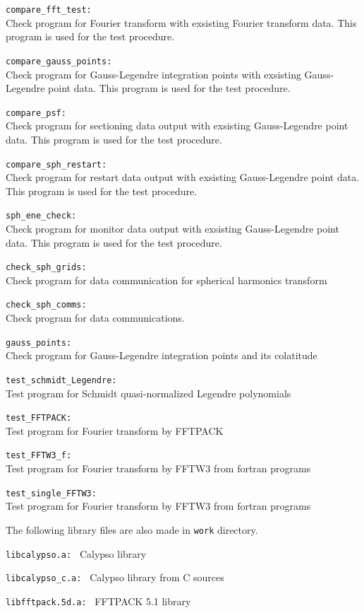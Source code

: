 \begin{description}
\item{\tt compare\_fft\_test:    }\\
	 Check program for Fourier transform with exsisting Fourier transform data. This program is used for the test procedure.
\item{\tt compare\_gauss\_points:    }\\
	 Check program for Gauss-Legendre integration points with exsisting Gauss-Legendre point data. This program is used for the test procedure.
\item{\tt compare\_psf:    }\\
	 Check program for sectioning data output with exsisting Gauss-Legendre point data. This program is used for the test procedure.
\item{\tt compare\_sph\_restart:    }\\
	 Check program for restart data output with exsisting Gauss-Legendre point data. This program is used for the test procedure.
\item{\tt sph\_ene\_check:    }\\
	 Check program for monitor data output with exsisting Gauss-Legendre point data. This program is used for the test procedure.
\item{\tt check\_sph\_grids:    }\\
	 Check program for data communication for spherical harmonics transform
\item{\tt check\_sph\_comms:   }\\
	  Check program for data communications.
\item{\tt gauss\_points:   }\\
	Check program for Gauss-Legendre integration points and its colatitude
\item{\tt test\_schmidt\_Legendre:   }\\
	 Test program for Schmidt quasi-normalized Legendre polynomials
\item{\tt test\_FFTPACK:   }\\
	Test program for Fourier transform by FFTPACK
\item{\tt test\_FFTW3\_f:   }\\
         Test program for Fourier transform by FFTW3 from fortran programs
\item{\tt test\_single\_FFTW3:   }\\
         Test program for Fourier transform by FFTW3 from fortran programs
\end{description}
%
The following library files are also made in {\tt work} directory.
%
\begin{description}
\item{\tt libcalypso.a:    } Calypso library
\item{\tt libcalypso\_c.a:    } Calypso library from C sources
\item{\tt libfftpack.5d.a: } FFTPACK 5.1 library
\end{description}
%

